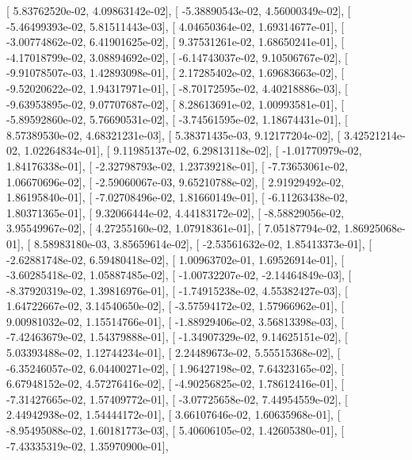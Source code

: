 \documentclass{article}
\begin{document}
       [  5.83762520e-02,   4.09863142e-02],
       [ -5.38890543e-02,   4.56000349e-02],
       [ -5.46499393e-02,   5.81511443e-03],
       [  4.04650364e-02,   1.69314677e-01],
       [ -3.00774862e-02,   6.41901625e-02],
       [  9.37531261e-02,   1.68650241e-01],
       [ -4.17018799e-02,   3.08894692e-02],
       [ -6.14743037e-02,   9.10506767e-02],
       [ -9.91078507e-03,   1.42893098e-01],
       [  2.17285402e-02,   1.69683663e-02],
       [ -9.52020622e-02,   1.94317971e-01],
       [ -8.70172595e-02,   4.40218886e-03],
       [ -9.63953895e-02,   9.07707687e-02],
       [  8.28613691e-02,   1.00993581e-01],
       [ -5.89592860e-02,   5.76690531e-02],
       [ -3.74561595e-02,   1.18674431e-01],
       [  8.57389530e-02,   4.68321231e-03],
       [  5.38371435e-03,   9.12177204e-02],
       [  3.42521214e-02,   1.02264834e-01],
       [  9.11985137e-02,   6.29813118e-02],
       [ -1.01770979e-02,   1.84176338e-01],
       [ -2.32798793e-02,   1.23739218e-01],
       [ -7.73653061e-02,   1.06670696e-02],
       [ -2.59060067e-03,   9.65210788e-02],
       [  2.91929492e-02,   1.86195840e-01],
       [ -7.02708496e-02,   1.81660149e-01],
       [ -6.11263438e-02,   1.80371365e-01],
       [  9.32066444e-02,   4.44183172e-02],
       [ -8.58829056e-02,   3.95549967e-02],
       [  4.27255160e-02,   1.07918361e-01],
       [  7.05187794e-02,   1.86925068e-01],
       [  8.58983180e-03,   3.85659614e-02],
       [ -2.53561632e-02,   1.85413373e-01],
       [ -2.62881748e-02,   6.59480418e-02],
       [  1.00963702e-01,   1.69526914e-01],
       [ -3.60285418e-02,   1.05887485e-02],
       [ -1.00732207e-02,  -2.14464849e-03],
       [ -8.37920319e-02,   1.39816976e-01],
       [ -1.74915238e-02,   4.55382427e-03],
       [  1.64722667e-02,   3.14540650e-02],
       [ -3.57594172e-02,   1.57966962e-01],
       [  9.00981032e-02,   1.15514766e-01],
       [ -1.88929406e-02,   3.56813398e-03],
       [ -7.42463679e-02,   1.54379888e-01],
       [ -1.34907329e-02,   9.14625151e-02],
       [  5.03393488e-02,   1.12744234e-01],
       [  2.24489673e-02,   5.55515368e-02],
       [ -6.35246057e-02,   6.04400271e-02],
       [  1.96427198e-02,   7.64323165e-02],
       [  6.67948152e-02,   4.57276416e-02],
       [ -4.90256825e-02,   1.78612416e-01],
       [ -7.31427665e-02,   1.57409772e-01],
       [ -3.07725658e-02,   7.44954559e-02],
       [  2.44942938e-02,   1.54444172e-01],
       [  3.66107646e-02,   1.60635968e-01],
       [ -8.95495088e-02,   1.60181773e-03],
       [  5.40606105e-02,   1.42605380e-01],
       [ -7.43335319e-02,   1.35970900e-01],
\end{document}
